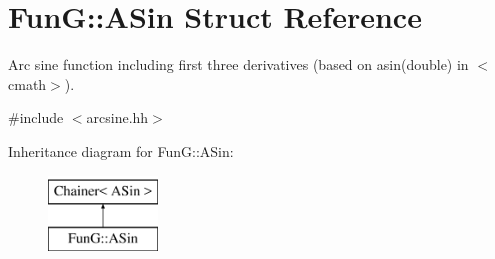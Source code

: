 \hypertarget{structFunG_1_1ASin}{}\section{FunG\+:\+:A\+Sin Struct Reference}
\label{structFunG_1_1ASin}


Arc sine function including first three derivatives (based on asin(double) in $<$cmath$>$).  




{\ttfamily \#include $<$arcsine.\+hh$>$}

Inheritance diagram for FunG\+:\+:A\+Sin\+:\begin{figure}[H]
\begin{center}
\leavevmode
\includegraphics[height=2.000000cm]{structFunG_1_1ASin}
\end{center}
\end{figure}
